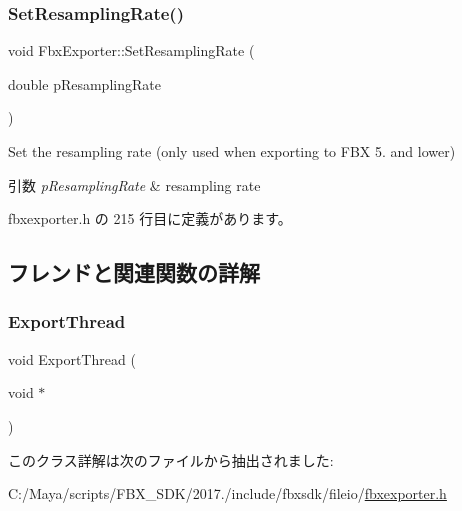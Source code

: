 \subsubsection{\texorpdfstring{Set\+Resampling\+Rate()}{SetResamplingRate()}}
{\footnotesize\ttfamily void Fbx\+Exporter\+::\+Set\+Resampling\+Rate (\begin{DoxyParamCaption}\item[{double}]{p\+Resampling\+Rate }\end{DoxyParamCaption})\hspace{0.3cm}{\ttfamily [inline]}}

Set the resampling rate (only used when exporting to F\+BX 5. and lower) 
\begin{DoxyParams}{引数}
{\em p\+Resampling\+Rate} & resampling rate \\
\hline
\end{DoxyParams}


 fbxexporter.\+h の 215 行目に定義があります。



\subsection{フレンドと関連関数の詳解}
\mbox{\label{class_fbx_exporter_af010f0ee37fe98ae37cd7cbe976e7a74}} 
\subsubsection{\texorpdfstring{Export\+Thread}{ExportThread}}
{\footnotesize\ttfamily void Export\+Thread (\begin{DoxyParamCaption}\item[{void $\ast$}]{ }\end{DoxyParamCaption})\hspace{0.3cm}{\ttfamily [friend]}}



このクラス詳解は次のファイルから抽出されました\+:\begin{DoxyCompactItemize}
\item 
C\+:/\+Maya/scripts/\+F\+B\+X\+\_\+\+S\+D\+K/2017./include/fbxsdk/fileio/\hyperlink{fbxexporter_8h}{fbxexporter.\+h}\end{DoxyCompactItemize}
